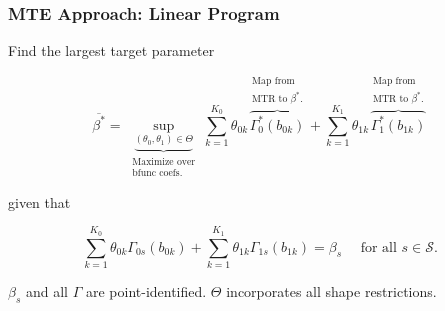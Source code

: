 \documentclass[11pt, aspectratio=169]{beamer}
\begin{document}
\begin{frame}
    \frametitle{MTE Approach: Linear Program}

    Find the largest target parameter


    \begin{equation*}
        \overline{\beta^*} = \underbrace{\sup_{(\theta_0, \theta_1) \in \Theta}}_{\substack{\text{Maximize over} \\ \text{bfunc coefs.}}}\sum_{k=1}^{K_0} \theta_{0k}\overbrace{\Gamma^*_0(b_{0k})}^{\substack{\text{Map from} \\ \text{MTR to } \beta^*.}} + \sum_{k=1}^{K_1} \theta_{1k}\overbrace{\Gamma^*_1(b_{1k})}^{\substack{\text{Map from} \\ \text{MTR to } \beta^*.}}
    \end{equation*}

    \pause

    given that

    \begin{equation*}
        \sum_{k=1}^{K_0} \theta_{0k}\Gamma_{0s}(b_{0k}) + \sum_{k=1}^{K_1} \theta_{1k} \Gamma_{1s}(b_{1k}) = \beta_s \quad \text{ for all } s\in\mathcal{S}.
    \end{equation*}

    \vspace{0.5cm}
    $\beta_s$ and all $\Gamma$ are point-identified.
    $\Theta$ incorporates all shape restrictions.

\end{frame}
\end{document}
